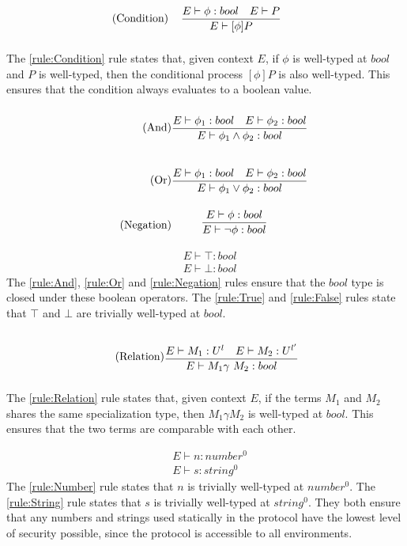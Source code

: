\begin{align*}
    \tag{Condition}\label{rule:Condition} &\infrule{E\vdash \phi:bool\quad E\vdash P}{E \vdash [\phi] P}
\end{align*}
The \ref{rule:Condition} rule states that, given context $E$, if $\phi$ is well-typed at $bool$ and $P$ is well-typed, then the conditional process $[\phi]P$ is also well-typed. This ensures that the condition always evaluates to a boolean value.
\begin{align*}
    \tag{And}\label{rule:And} &\infrule{E\vdash \phi _1:bool \quad E\vdash \phi _2:bool}{E\vdash \phi _1 \land \phi _2:bool}\\
    \tag{Or}\label{rule:Or} &\infrule{E\vdash \phi _1:bool \quad E\vdash \phi _2:bool}{E\vdash \phi _1 \lor \phi _2:bool}\\
    \tag{Negation}\label{rule:Negation} &\infrule{E\vdash \phi :bool }{E\vdash \neg \phi :bool}
\end{align*}
\begin{align*}
    \tag{True}\label{rule:True} &E\vdash\top:bool\\
    \tag{False}\label{rule:False} &E\vdash\bot:bool
\end{align*}
The \ref{rule:And}, \ref{rule:Or} and \ref{rule:Negation} rules ensure that the $bool$ type is closed under these boolean operators. The \ref{rule:True} and \ref{rule:False} rules state that $\top$ and $\bot$ are trivially well-typed at $bool$.

\begin{align*}
    \tag{Relation}\label{rule:Relation} &\infrule{E\vdash M_1:U^l\quad E\vdash M_2:U^{l'}}{E\vdash M_1 \gamma\ M_2:bool}
\end{align*}
The \ref{rule:Relation} rule states that, given context $E$, if the terms $M_1$ and $M_2$ shares the same specialization type, then $M_1\gamma M_2$ is well-typed at $bool$. This ensures that the two terms are comparable with each other.

\begin{align*}
    \tag{Number}\label{rule:Number} &E\vdash n:{number^0}\\
    \tag{String}\label{rule:String} &E\vdash s:{string^0}
\end{align*}
The \ref{rule:Number} rule states that $n$ is trivially well-typed at $number^0$.
The \ref{rule:String} rule states that $s$ is trivially well-typed at $string^0$.
They both ensure that any numbers and strings used statically in the protocol have the lowest level of security possible, since the protocol is accessible to all environments.

